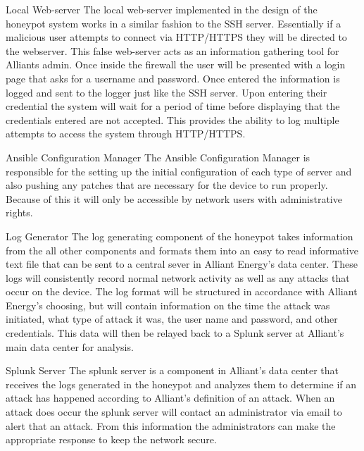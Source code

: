 \item Local Web-server
\newline
The local web-server implemented in the design of the honeypot system works in a similar fashion to the SSH server. Essentially if a malicious user attempts to connect via HTTP/HTTPS they will be directed to the webserver.  This false web-server acts as an information gathering tool for Alliants admin.  Once inside the firewall the user will be presented with a login page that asks for a username and password.  Once entered the information is logged and sent to the logger just like the SSH server.  Upon entering their credential the system will wait for a period of time before displaying that the credentials entered are not accepted.  This provides the ability to log multiple attempts to access the system through HTTP/HTTPS.

\item Ansible Configuration Manager
\newline
The Ansible Configuration Manager is responsible for the setting up the initial configuration of each type of server and also pushing any patches that are necessary for the device to run properly.  Because of this it will only be accessible by network users with administrative rights.

\item Log Generator
\newline
The log generating component of the honeypot takes information from the all other components and formats them into an easy to read informative text file that can be sent to a central sever in Alliant Energy's data center.  These logs will consistently record normal network activity as well as any attacks that occur on the device.  The log format will be structured in accordance with Alliant Energy's choosing, but will contain information on the time the attack was initiated, what type of attack it was, the user name and password, and other credentials.  This data will then be relayed back to a Splunk server at Alliant's main data center for analysis.

\item Splunk Server
\newline
The splunk server is a component in Alliant's data center that receives the logs generated in the honeypot and analyzes them to determine if an attack has happened according to Alliant's definition of an attack.  When an attack does occur the splunk server will contact an administrator via email to alert that an attack.  From this information the administrators can make  the appropriate response to keep the network secure.

